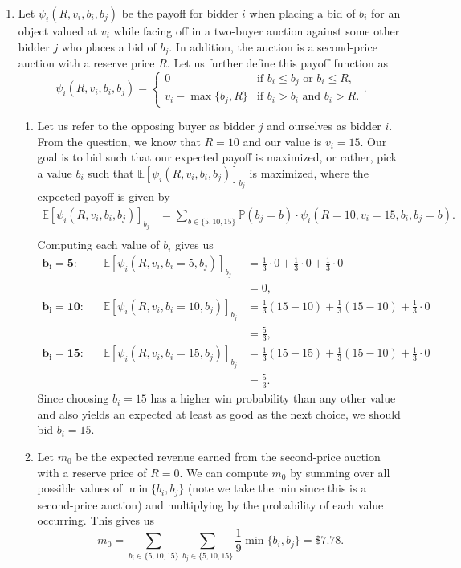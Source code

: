 \documentclass{article}
\newcommand{\pay}[2]{\psi_{#1}\left(#2\right)}
\newcommand{\prob}[1]{\mathbb{P}\left( #1 \right)}
\newcommand{\expp}[1]{\mathbb{E}\left[ #1 \right]}
\begin{document}
\begin{enumerate}
    \item Let $\pay{i}{R,v_i,b_i,b_j}$ be the payoff for bidder $i$ when placing a bid of $b_i$ for an object valued at $v_i$ while facing off in a two-buyer auction against some other bidder $j$ who places a bid of $b_j$. In addition, the auction is a second-price auction with a reserve price $R$. Let us further define this payoff function as 
    $$\pay{i}{R,v_i,b_i,b_j}=\begin{cases}
        0 & \text{if } b_i\leq b_j\text{ or } b_i\leq R, \\
        v_i-\max\{b_j,R\} & \text{if } b_i>b_i \text{ and } b_i>R.
    \end{cases}.$$
    \begin{enumerate}
        \item Let us refer to the opposing buyer as bidder $j$ and ourselves as bidder $i$. From the question, we know that $R=10$ and our value is $v_i=15$. Our goal is to bid such that our expected payoff is maximized, or rather, pick a value $b_i$ such that $\expp{\pay{i}{R,v_i,b_i,b_j}}_{b_j}$ is maximized, where the expected payoff is given by
        \begin{align*}
            \expp{\pay{i}{R,v_i,b_i,b_j}}_{b_j} & =\sum_{b\in\{5,10,15\}} \prob{b_j=b}\cdot\pay{i}{R=10,v_i=15,b_i,b_j=b}. \\
        \end{align*}
        Computing each value of $b_i$ gives us
        \begin{align*}
            \mathbf{b_i=5:} && \expp{\pay{i}{R,v_i,b_i=5,b_j}}_{b_j} & =\frac{1}{3}\cdot0+\frac{1}{3}\cdot0+\frac{1}{3}\cdot0 \\
            &&& =0, \\
            \mathbf{b_i=10:} && \expp{\pay{i}{R,v_i,b_i=10,b_j}}_{b_j} & =\frac{1}{3}(15-10)+\frac{1}{3}(15-10)+\frac{1}{3}\cdot0\\
            &&& =\frac{5}{3}, \\
            \mathbf{b_i=15:} && \expp{\pay{i}{R,v_i,b_i=15,b_j}}_{b_j} & =\frac{1}{3}(15-15)+\frac{1}{3}(15-10)+\frac{1}{3}\cdot0 \\
            &&& =\frac{5}{3}.
        \end{align*}
        Since choosing $b_i=15$ has a higher win probability than any other value and also yields an expected at least as good as the next choice, we should bid $b_i=15$.
        
        \item Let $m_0$ be the expected revenue earned from the second-price auction with a reserve price of $R=0$. We can compute $m_0$ by summing over all possible values of $\min\{b_i,b_j\}$ (note we take the min since this is a second-price auction) and multiplying by the probability of each value occurring. This gives us
        $$m_0=\sum_{b_i\in\{5,10,15\} }\sum_{b_j\in\{5,10,15\}}\frac{1}{9}\min\{b_i,b_j\}=\$7.78.$$


\end{enumerate}
\end{enumerate}
\end{document}
